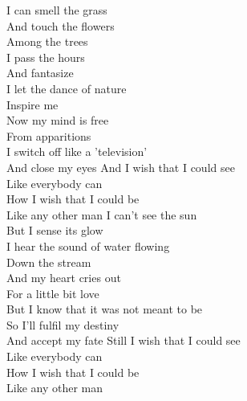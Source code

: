 \clearpage
{}
I can smell the grass\\
And touch the flowers\\
Among the trees\\
I pass the hours\\
And fantasize\\
I let the dance of nature\\
Inspire me\\
Now my mind is free\\
From apparitions\\
I switch off like a 'television'\\
And close my eyes
\hops
{} And I wish that I could see\\
 Like everybody can\\
 How I wish that I could be\\
 Like any other man
\hops
I can't see the sun\\
But I sense its glow\\
I hear the sound of water flowing\\
Down the stream\\
And my heart cries out\\
For a little bit love\\
But I know that it was not meant to be\\
So I'll fulfil my destiny\\
And accept my fate
\hops
{} Still I wish that I could see\\
 Like everybody can\\
 How I wish that I could be\\
 Like any other man

\clearpage
{}

